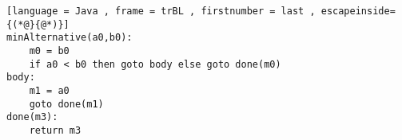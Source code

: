\begin{lstlisting}[language = Java , frame = trBL , firstnumber = last , escapeinside={(*@}{@*)}]
minAlternative(a0,b0):
    m0 = b0
    if a0 < b0 then goto body else goto done(m0)
body:
    m1 = a0
    goto done(m1)
done(m3):
    return m3
\end{lstlisting}